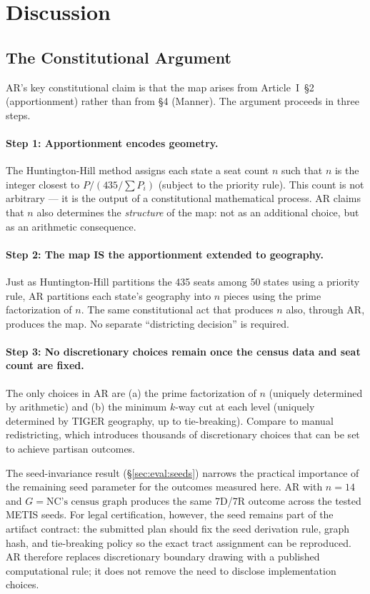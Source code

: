 \section{Discussion}
\label{sec:discussion}

\subsection{The Constitutional Argument}
\label{sec:discussion:constitutional}

AR's key constitutional claim is that the map arises from Article~I~\S2
(apportionment) rather than from \S4 (Manner). The argument proceeds in
three steps.

\paragraph{Step 1: Apportionment encodes geometry.}
The Huntington-Hill method assigns each state a seat count $n$ such that
$n$ is the integer closest to $P / (435/\sum P_i)$ (subject to the priority
rule). This count is not arbitrary --- it is the output of a constitutional
mathematical process. AR claims that $n$ also determines the \emph{structure}
of the map: not as an additional choice, but as an arithmetic consequence.

\paragraph{Step 2: The map IS the apportionment extended to geography.}
Just as Huntington-Hill partitions the 435 seats among 50 states using a
priority rule, AR partitions each state's geography into $n$ pieces using
the prime factorization of $n$. The same constitutional act that produces $n$
also, through AR, produces the map. No separate ``districting decision'' is
required.

\paragraph{Step 3: No discretionary choices remain once the census data and seat count are fixed.}
The only choices in AR are (a) the prime factorization of $n$ (uniquely
determined by arithmetic) and (b) the minimum $k$-way cut at each level
(uniquely determined by TIGER geography, up to tie-breaking). Compare to
manual redistricting, which introduces thousands of discretionary choices that
can be set to achieve partisan outcomes.

The seed-invariance result (\S\ref{sec:eval:seeds}) narrows the practical
importance of the remaining seed parameter for the outcomes measured here.
AR with $n = 14$ and $G = \text{NC's census graph}$ produces the same 7D/7R
outcome across the tested METIS seeds.
For legal certification, however, the seed remains part of the artifact
contract: the submitted plan should fix the seed derivation rule, graph hash,
and tie-breaking policy so the exact tract assignment can be reproduced.
AR therefore replaces discretionary boundary drawing with a published
computational rule; it does not remove the need to disclose implementation
choices.

